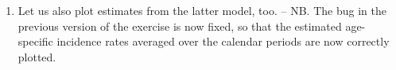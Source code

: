 \documentclass[
]{book}
\newenvironment{Shaded}{\begin{snugshade}}{\end{snugshade}}
\newcommand{\AttributeTok}[1]{\textcolor[rgb]{0.13,0.29,0.53}{#1}}
\newcommand{\DecValTok}[1]{\textcolor[rgb]{0.00,0.00,0.81}{#1}}
\newcommand{\FunctionTok}[1]{\textcolor[rgb]{0.13,0.29,0.53}{\textbf{#1}}}
\newcommand{\NormalTok}[1]{#1}
\newcommand{\OtherTok}[1]{\textcolor[rgb]{0.56,0.35,0.01}{#1}}
\newcommand{\SpecialCharTok}[1]{\textcolor[rgb]{0.81,0.36,0.00}{\textbf{#1}}}
\providecommand{\tightlist}{%
  \setlength{\itemsep}{0pt}\setlength{\parskip}{0pt}}
\begin{document}
\begin{Shaded}
\end{Shaded}

\begin{enumerate}
\def\labelenumi{\arabic{enumi}.}
\setcounter{enumi}{3}
\tightlist
\item
  Let us also plot estimates from the latter model, too. -- NB. The bug
  in the previous version of the exercise is now fixed, so that
  the estimated age-specific incidence rates averaged over the calendar
  periods are now correctly plotted.
\end{enumerate}
\end{document}

